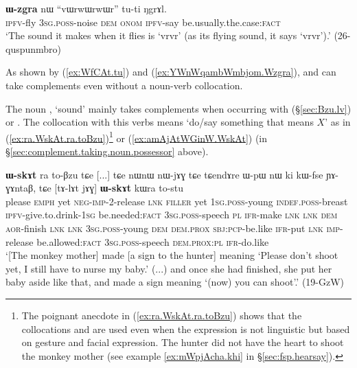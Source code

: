 \begin{exe}
   \ex  \label{ex:YWnWqambWmbjom.Wzgra}
\gll [ɲɯ-nɯqambɯmbjom] \textbf{ɯ-zgra} nɯ ``vɯrwɯrwɯr'' tu-ti ŋgrɤl. \\
\textsc{ipfv}-fly \textsc{3sg}.\textsc{poss}-noise \textsc{dem} \textsc{onom} \textsc{ipfv}-say be.usually.the.case:\textsc{fact} \\
\glt `The sound it makes when it flies is `vrvr' (as its flying sound, it says `vrvr').' (26-quspunmbro)
\end{exe}
 

As shown by (\ref{ex:WfCAt.tu}) and (\ref{ex:YWnWqambWmbjom.Wzgra}),  and  can take complements even without a noun-verb collocation. 

The noun , `sound' mainly takes complements when occurring with  (§\ref{sec:Bzu.lv}) or . The collocation with this verbs means `do/say something that means $X$' as in (\ref{ex:ra.WskAt.ra.toBzu})\footnote{The poignant anecdote in (\ref{ex:ra.WskAt.ra.toBzu}) shows that the collocations  and  are used even when the expression is not linguistic but based on gesture and facial expression. The hunter did not have the heart to shoot the monkey mother (see example \ref{ex:mWpjAcha.khi} in §\ref{sec:fsp.hearsay}). } or (\ref{ex:amAjAtWGinW.WskAt}) (in §\ref{sec:complement.taking.noun.possessor} above).

\begin{exe}
   \ex  \label{ex:ra.WskAt.ra.toBzu}
 \textbf{ɯ-skɤt} ra to-βzu tɕe [...] tɕe nɯnɯ nɯ-jɤɣ tɕe tɕendɤre ɯ-pɯ nɯ ki kɯ-fse ɲɤ-ɣɤntaβ,
tɕe [tɤ-lɤt jɤɣ] \textbf{ɯ-skɤt} kɯra to-stu \\
please \textsc{emph} yet \textsc{neg}-\textsc{imp}-2-release \textsc{lnk} \textsc{filler} yet \textsc{1sg}.\textsc{poss}-young \textsc{indef}.\textsc{poss}-breast \textsc{ipfv}-give.to.drink-\textsc{1sg} be.needed:\textsc{fact} \textsc{3sg}.\textsc{poss}-speech \textsc{pl} \textsc{ifr}-make \textsc{lnk} {  } \textsc{lnk} \textsc{dem} \textsc{aor}-finish \textsc{lnk} \textsc{lnk} \textsc{3sg}.\textsc{poss}-young \textsc{dem} \textsc{dem}.\textsc{prox} \textsc{sbj}:\textsc{pcp}-be.like \textsc{ifr}-put \textsc{lnk} \textsc{imp}-release be.allowed:\textsc{fact} \textsc{3sg}.\textsc{poss}-speech \textsc{dem}.\textsc{prox}:\textsc{pl} \textsc{ifr}-do.like \\
\glt `[The monkey mother] made [a sign to the hunter] meaning `Please don't shoot yet, I still have to nurse my baby.' (...) and once she had finished, she put her baby aside like that, and made a sign meaning `(now) you can shoot'.' (19-GzW)
\end{exe}

